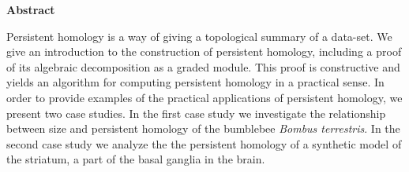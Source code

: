 \newenvironment{abstract}%
    {\cleardoublepage\thispagestyle{empty}\null\vfill\begin{center}%
    \bfseries Abstract \end{center}}%
    {\vfill\null}
        \begin{abstract}
          Persistent homology is a way of giving a topological summary of a data-set. We give an introduction to the construction of persistent homology, including a proof of its algebraic decomposition as a graded module. This proof is constructive and yields an algorithm for computing persistent homology in a practical sense. In order to provide examples of the practical applications of persistent homology, we present two case studies. In the first case study we investigate the relationship between size and persistent homology of the bumblebee \textit{Bombus terrestris}. In the second case study we analyze the the persistent homology of a synthetic model of the striatum, a part of the basal ganglia in the brain.
        \end{abstract}
